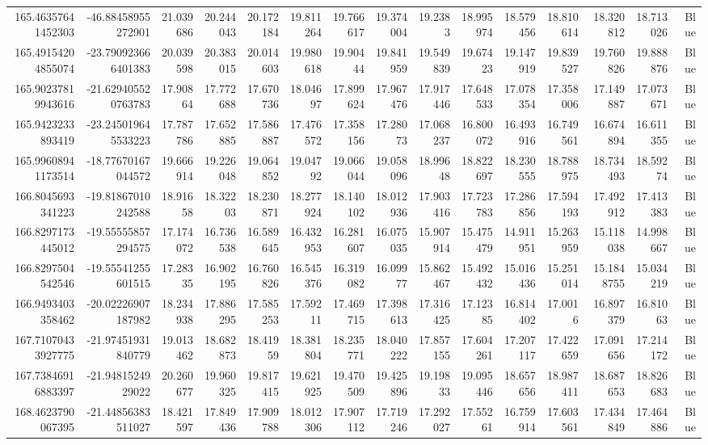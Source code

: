 \begin{center}
\begin{longtable}{rrrrrrrrrrrrrrr}
165.46357641452303 & -46.88458955272901 & 21.039686 & 20.244043 & 20.172184 & 19.811264 & 19.766617 & 19.374004 & 19.2383 & 18.995974 & 18.579456 & 18.810614 & 18.320812 & 18.713026 & Blue \\
165.49154204855074 & -23.790923666401383 & 20.039598 & 20.383015 & 20.014603 & 19.980618 & 19.90444 & 19.841959 & 19.549839 & 19.67423 & 19.147919 & 19.839527 & 19.760826 & 19.888876 & Blue \\
165.90237819943616 & -21.629405520763783 & 17.90864 & 17.772688 & 17.670736 & 18.04697 & 17.899624 & 17.967476 & 17.917446 & 17.648533 & 17.078354 & 17.358006 & 17.149887 & 17.073671 & Blue \\
165.9423233893419 & -23.245019645533223 & 17.787786 & 17.652885 & 17.586887 & 17.476572 & 17.358156 & 17.28073 & 17.068237 & 16.800072 & 16.493916 & 16.749561 & 16.674894 & 16.611355 & Blue \\
165.99608941173514 & -18.77670167044572 & 19.666914 & 19.226048 & 19.064852 & 19.04792 & 19.066044 & 19.058096 & 18.99648 & 18.822697 & 18.230555 & 18.788975 & 18.734493 & 18.59274 & Blue \\
166.8045693341223 & -19.81867010242588 & 18.91658 & 18.32203 & 18.230871 & 18.277924 & 18.140102 & 18.012936 & 17.903416 & 17.723783 & 17.286856 & 17.594193 & 17.492912 & 17.413383 & Blue \\
166.8297173445012 & -19.55555857294575 & 17.174072 & 16.736538 & 16.589645 & 16.432953 & 16.281607 & 16.075035 & 15.907914 & 15.475479 & 14.911951 & 15.263959 & 15.118038 & 14.998667 & Blue \\
166.8297504542546 & -19.55541255601515 & 17.28335 & 16.902195 & 16.760826 & 16.545376 & 16.319082 & 16.09977 & 15.862467 & 15.492432 & 15.016436 & 15.251014 & 15.1848755 & 15.034219 & Blue \\
166.9493403358462 & -20.02226907187982 & 18.234938 & 17.886295 & 17.585253 & 17.59211 & 17.469715 & 17.398613 & 17.316425 & 17.12385 & 16.814402 & 17.0016 & 16.897379 & 16.81063 & Blue \\
167.71070433927775 & -21.97451931840779 & 19.013462 & 18.682873 & 18.41959 & 18.381804 & 18.235771 & 18.040222 & 17.857155 & 17.604261 & 17.207117 & 17.422659 & 17.091656 & 17.214172 & Blue \\
167.73846916883397 & -21.9481524929022 & 20.260677 & 19.960325 & 19.817415 & 19.621925 & 19.470509 & 19.425896 & 19.19833 & 19.095446 & 18.657656 & 18.987411 & 18.687653 & 18.826683 & Blue \\
168.4623790067395 & -21.44856383511027 & 18.421597 & 17.849436 & 17.909788 & 18.012306 & 17.907112 & 17.719246 & 17.292027 & 17.55261 & 16.759914 & 17.603561 & 17.434849 & 17.464886 & Blue \\

\end{longtable}
\end{center}

